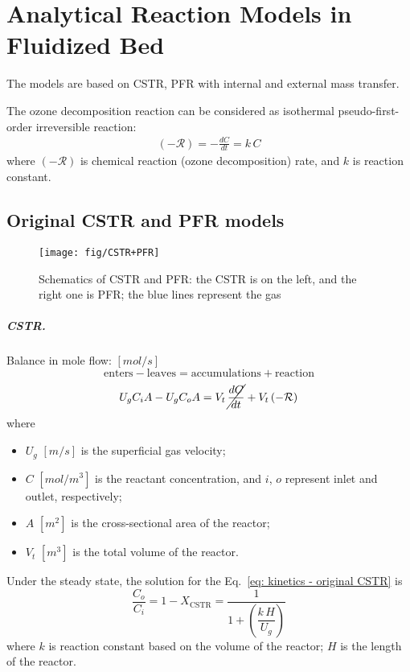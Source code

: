 \chapter{Analytical Reaction Models in Fluidized Bed}
The models are based on CSTR, PFR with internal and external mass transfer. 

The ozone decomposition reaction can be considered as isothermal pseudo-first-order irreversible reaction: 
\begin{align}
    (-\mathcal{R}) = -\frac{dC}{dt} = k\,C
\end{align}
where $(-\mathcal{R})$ is chemical reaction (ozone decomposition) rate, 
and $k$ is reaction constant. 

\section{Original CSTR and PFR models}
\begin{figure}[h!]
    \raggedleft
    \texttt{[image: fig/CSTR+PFR]}
    \caption{Schematics of CSTR and PFR: the CSTR is on the left, and the right one is PFR; the blue lines represent the gas}
    \label{fig: CSTR + PFR} 
\end{figure}

\paragraph{CSTR. }
Balance in mole flow:
$[\si{mol/s}]$
\begin{equation*}
    \text{enters} - \text{leaves}
    = \text{accumulations} + \text{reaction}
\end{equation*}
\begin{equation}
    U_g C_i A - U_g C_o A 
    = V_t \, \cancel{\frac{dC}{dt}} 
    + V_t \,(\mathcal{-R})
    \label{eq: kinetics - original CSTR}
\end{equation}
where
\begin{itemize}
    \item $U_g$ $[\si{m/s}]$ is the superficial gas velocity;
    \item $C$ $[\si{mol/m^3}]$ is the reactant concentration, and $i$, $o$ represent inlet and outlet, respectively;
    \item $A$ $[\si{m^2}]$ is the cross-sectional area of the reactor;
    \item $V_t$ $[\si{m^3}]$ is the total volume of the reactor.
\end{itemize}

Under the steady state, the solution for the Eq.~\eqref{eq: kinetics - original CSTR} is 
\begin{equation}
    \frac{C_o}{C_i} = 1-X_\text{CSTR} 
    = \frac{1}{1+\left(\dfrac{k\,H}{U_g}\right)}
    \label{eq: solution - original - CSTR}
\end{equation}
where $k$ is reaction constant based on the volume of the reactor; 
$H$ is the length of the reactor.

